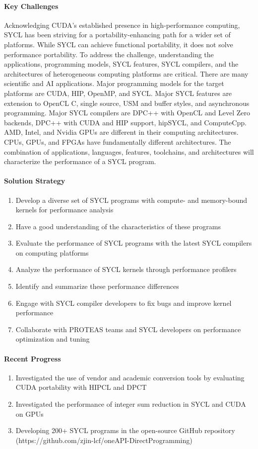 \paragraph{Key Challenges}
Acknowledging CUDA's established presence in high-performance computing, SYCL has been striving for a portability-enhancing path for a wider set of platforms. While SYCL can achieve functional portability, it does not solve performance portability. To address the challenge, understanding the applications, programming models, SYCL features, SYCL compilers, and the architectures of heterogeneous computing platforms are critical. There are many scientific and AI applications. Major programming models for the target platforms are CUDA, HIP, OpenMP, and SYCL. Major SYCL features are extension to OpenCL C, single source, USM and buffer styles, and asynchronous programming. Major SYCL compilers are DPC++ with OpenCL and Level Zero backends, DPC++ with CUDA and HIP support, hipSYCL, and ComputeCpp. AMD, Intel, and Nvidia GPUs are different in their computing architectures. CPUs, GPUs, and FPGAs have fundamentally different architectures. The combination of applications, languages, features, toolchains, and architectures will characterize the performance of a SYCL program.


\paragraph{Solution Strategy}
\begin{enumerate}
\item Develop a diverse set of SYCL programs with compute- and memory-bound kernels for performance analysis  
\item Have a good understanding of the characteristics of these programs 
\item Evaluate the performance of SYCL programs with the latest SYCL compilers on computing platforms
\item Analyze the performance of SYCL kernels through performance profilers
\item Identify and summarize these performance differences
\item Engage with SYCL compiler developers to fix bugs and improve kernel performance
\item Collaborate with PROTEAS teams and SYCL developers on performance optimization and tuning
\end{enumerate}


\paragraph{Recent Progress}
\begin{enumerate}
\item Investigated the use of vendor and academic conversion tools by evaluating CUDA portability with HIPCL and DPCT \cite{dpct}
\item Investigated the performance of integer sum reduction in SYCL and CUDA on GPUs \cite{reduction}
\item Developing 200+ SYCL programs in the open-source GitHub repository (https://github.com/zjin-lcf/oneAPI-DirectProgramming)
\end{enumerate}


